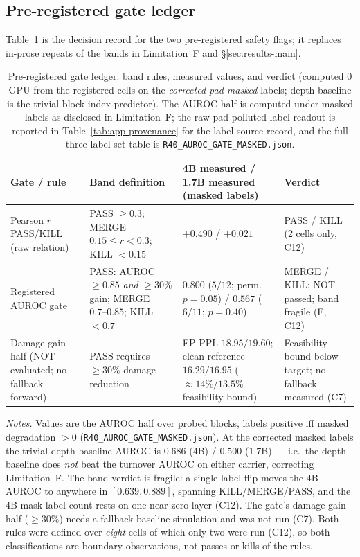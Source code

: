 \subsection{Pre-registered gate ledger}
\label{app:gate-ledger}
Table~\ref{tab:app-gate} is the decision record for the two pre-registered safety flags; it
replaces in-prose repeats of the bands in Limitation~F and \S\ref{sec:results-main}.

\begin{table}[H]
\centering
\setlength{\tabcolsep}{4pt}
\caption{Pre-registered gate ledger: band rules, measured values, and verdict (computed 0 GPU
from the registered cells on the \emph{corrected pad-masked} labels; depth baseline is the
trivial block-index predictor). The AUROC half is computed under masked labels as disclosed in
Limitation~F; the raw pad-polluted label readout is reported in
Table~\ref{tab:app-provenance} for the label-source record, and the full three-label-set table
is \texttt{R40\_AUROC\_GATE\_MASKED.json}.}
\label{tab:app-gate}
\footnotesize
\begin{tabularx}{\textwidth}{>{\raggedright\arraybackslash}X
 >{\raggedright\arraybackslash}X >{\raggedright\arraybackslash}X
 >{\raggedright\arraybackslash}X}
\toprule
Gate / rule & Band definition & 4B measured / 1.7B measured (masked labels) & Verdict \\
\midrule
Pearson $r$ PASS/KILL (raw relation) & PASS $\ge 0.3$; MERGE $0.15\le r<0.3$; KILL $<0.15$ & $+0.490$ / $+0.021$ & PASS / KILL (2 cells only, C12) \\
Registered AUROC gate & PASS: AUROC $\ge 0.85$ \emph{and} $\ge 30\%$ gain; MERGE $0.7\text{--}0.85$; KILL $<0.7$ & $0.800$ ($5/12$; perm.\ $p{=}0.05$) / $0.567$ ($6/11$; $p{=}0.40$) & MERGE / KILL; NOT passed; band fragile (F, C12) \\
Damage-gain half (NOT evaluated; no fallback forward) & PASS requires $\ge 30\%$ damage reduction & FP PPL $18.95/19.60$; clean reference $16.29/16.95$ ($\approx14\%/13.5\%$ feasibility bound) & Feasibility-bound below target; no fallback measured (C7) \\
\bottomrule
\end{tabularx}

\smallskip
\begin{minipage}{\textwidth}
\footnotesize\raggedright
\emph{Notes.} Values are the AUROC half over probed blocks, labels positive iff masked
degradation $>0$ (\texttt{R40\_AUROC\_GATE\_MASKED.json}). At the corrected masked labels the
trivial depth-baseline AUROC is $0.686$ (4B) / $0.500$ (1.7B) --- i.e.\ the depth baseline does
\emph{not} beat the turnover AUROC on either carrier, correcting Limitation~F.
The band verdict is fragile: a single label flip moves the 4B AUROC to anywhere in
$[0.639,0.889]$, spanning KILL/MERGE/PASS, and the 4B mask label count rests on one near-zero
layer (C12). The gate's damage-gain half ($\ge 30\%$) needs a fallback-baseline simulation and
was not run (C7). Both rules were defined over \emph{eight} cells of which only two were run
(C12), so both classifications are boundary observations, not passes or kills of the rules.
\end{minipage}
\end{table}
